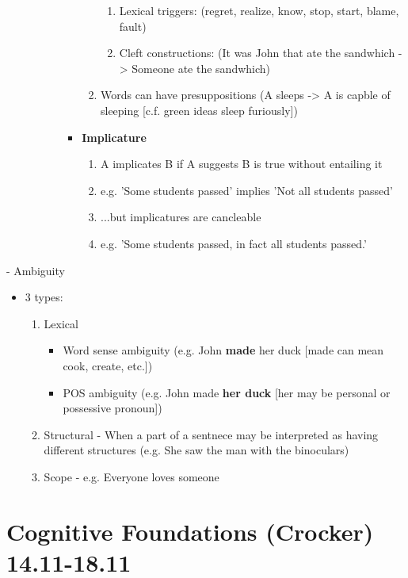 \documentclass[11pt]{article}
\begin{document}
\begin{itemize}
\begin{itemize}
\begin{itemize}
\begin{itemize}
\begin{enumerate}
	  \begin{enumerate}
	   \item Lexical triggers: (regret, realize, know, stop, start, blame, fault)
	   \item Cleft constructions: (It was John that ate the sandwhich -> Someone ate the sandwhich)
	  \end{enumerate}
	 \item Words can have presuppositions (A sleeps -> A is capble of sleeping [c.f. green ideas sleep furiously])
	\end{enumerate}
       \item {\bf Implicature}
	\begin{enumerate}
	 \item A implicates B if A suggests B is true without entailing it
	 \item e.g. 'Some students passed' implies 'Not all students passed'
         \item ...but implicatures are cancleable
	 \item e.g. 'Some students passed, in fact all students passed.'
	\end{enumerate}
      \end{itemize}
    \end{itemize}
  \end{itemize}
\end{itemize}
- Ambiguity
\begin{itemize}
 \item 3 types:
  \begin{enumerate}
   \item Lexical
    \begin{itemize}
     \item Word sense ambiguity (e.g. John {\bf made} her duck [made can mean cook, create, etc.])
     \item POS ambiguity (e.g. John made {\bf her duck} [her may be personal or possessive pronoun])
    \end{itemize}
   \item Structural - When a part of a sentnece may be interpreted as having different structures (e.g. She saw the man with the binoculars)
   \item Scope - e.g. Everyone loves someone
  \end{enumerate}

\end{itemize}



\section{ Cognitive Foundations (Crocker) 14.11-18.11}
\end{document}
